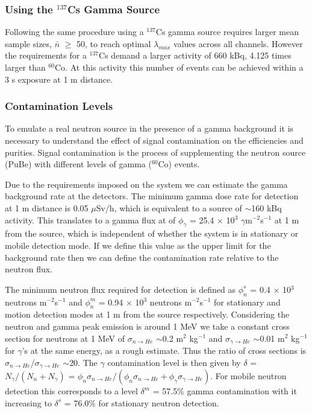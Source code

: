 \subsubsection{Using the $^{137}$Cs Gamma Source}
Following the same procedure using a $^{137}$Cs gamma source requires larger mean sample sizes, $\bar{n}$ $\ge$ 50, to reach optimal $\lambda_{max}$ values across all channels. However the requirements for a $^{137}$Cs demand a larger activity of 660 kBq, 4.125 times larger than $^{60}$Co. At this activity this number of events can be achieved within a 3 s exposure at 1 m distance.

\subsubsection{Contamination Levels}
To emulate a real neutron source in the presence of a gamma background it is necessary to understand the effect of signal contamination on the efficiencies and purities. Signal contamination is the process of supplementing the neutron source (PuBe) with different levels of gamma ($^{60}$Co) events. 

Due to the requirements imposed on the system we can estimate the gamma background rate at the detectors. The minimum gamma dose rate for detection at 1 m distance is 0.05 $\mu$Sv/h, which is equivalent to a source of $\sim$160 kBq activity. This translates to a gamma flux at of $\phi_{\gamma}$ = 25.4 $\times$ 10$^{3}$ $\gamma$m$^{-2}$s$^{-1}$ at 1 m from the source, which is independent of whether the system is in stationary or mobile detection mode. If we define this value as the upper limit for the background rate then we can define the contamination rate relative to the neutron flux. 

The minimum neutron flux required for detection is defined as $\phi^{s}_{n}$ = 0.4 $\times$ 10$^{3}$ neutrons m$^{-2}$s$^{-1}$ and $\phi^{m}_{n}$ = 0.94 $\times$ 10$^{3}$ neutrons m$^{-2}$s$^{-1}$ for stationary and motion detection modes at 1 m from the source respectively. Considering the neutron and gamma peak emission is around 1 MeV we take a constant cross section for neutrons at 1 MeV of $\sigma_{n \rightarrow He}$ $\sim$0.2 m$^{2}$ kg$^{-1}$ and $\sigma_{\gamma \rightarrow He}$ $\sim$0.01 m$^{2}$ kg$^{-1}$ for $\gamma$'s at the same energy, as a rough estimate. Thus the ratio of cross sections is $\sigma_{n \rightarrow He}$/$\sigma_{\gamma \rightarrow He}$ $\sim$20. The $\gamma$ contamination level is then given by $\delta$ = $N_{\gamma}/(N_{n} + N_{\gamma})$ = $\phi_{n}\sigma_{n \rightarrow He} / (\phi_{n}\sigma_{n \rightarrow He} + \phi_{\gamma}\sigma_{\gamma \rightarrow He})$. For mobile neutron detection this corresponds to a level $\delta^{m}$ = 57.5\% gamma contamination with it increasing to $\delta^{s}$ = 76.0\% for stationary neutron detection. 

